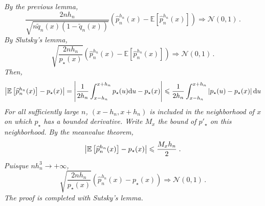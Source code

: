 \begin{enumerate}
{\em
By the previous lemma,
\[
\frac{2nh_n}{\sqrt{n\tilde q_n(x)(1-\tilde q_n(x))}}\left(\widehat{p}^{h_n}_n(x) - \mathbb{E}\left[\widehat{p}^{h_n}_n(x)\right]\right)\Rightarrow \mathcal{N}(0,1)\,.
\] 
By Slutsky's lemma,
\[
\sqrt{\frac{2nh_n}{p_{\star}(x)}}\left(\widehat{p}^{h_n}_n(x) - \mathbb{E}\left[\widehat{p}^{h_n}_n(x)\right]\right)\Rightarrow \mathcal{N}(0,1)\,.
\] 
Then,
$$
\left|\mathbb{E}\left[\widehat{p}^{h_n}_n(x)\right] - p_{\star}(x)\right| = \left|\frac{1}{2h_n}\int_{x-h_n}^{x+h_n}p_{\star}(u)\mathrm{d} u- p_{\star}(x)\right|\leqslant \frac{1}{2h_n}\int_{x-h_n}^{x+h_n}\left|p_{\star}(u)-p_{\star}(x)\right|\mathrm{d} u
$$
For all sufficiently large $n$, $(x-h_n,x+h_n)$ is included in the neighborhood of $x$ on which $p_{\star}$ has a bounded derivative. Write $M_x$ the bound of $p'_\star$ on this neighborhood. By the meanvalue theorem,
$$
\left|\mathbb{E}\left[\widehat{p}^{h_n}_n(x)\right] - p_{\star}(x)\right| \leqslant \frac{M_xh_n}{2}\;.
$$
Puisque $nh_n^3\to +\infty$, 
\[
\sqrt{\frac{2nh_n}{p_{\star}(x)}}\left(\widehat{p}^{h_n}_n(x) - p_{\star}(x)\right)\Rightarrow \mathcal{N}(0,1)\,.
\] 
The proof is completed with Sutsky's lemma.
}
\end{enumerate}


